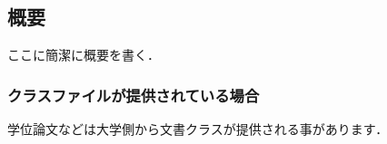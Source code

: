 \begin{InTeX}
\chapter*{概要}
ここに簡潔に概要を書く．
\end{InTeX}




\subsection{クラスファイルが提供されている場合}

学位論文などは大学側から文書クラスが提供される事があります．

